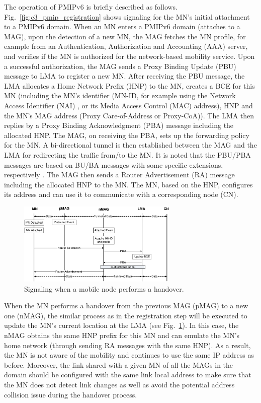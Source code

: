 The operation of PMIPv6 is briefly described as follows. Fig.~\ref{fig:c3_pmip_registration} shows signaling for the MN's initial attachment to a PMIPv6 domain. When an MN enters a PMIPv6 domain (attaches to a MAG), upon the detection of a new MN, the MAG fetches the MN profile, for example from an Authentication, Authorization and Accounting (AAA) server, and verifies if the MN is authorized for the network-based mobility service. Upon a successful authorization, the MAG sends a Proxy Binding Update (PBU) message to LMA to register a new MN. After receiving the PBU message, the LMA allocates a Home Network Prefix (HNP) to the MN, creates a BCE for this MN (including the MN's identifier (MN-ID, for example using the Network Access Identifier (NAI) \cite{NAI}, or its Media Access Control (MAC) address), HNP and the MN's MAG address (Proxy Care-of-Address or Proxy-CoA)). The LMA then replies by a Proxy Binding Acknowledgment (PBA) message including the allocated HNP. The MAG, on receiving the PBA, sets up the forwarding policy for the MN. A bi-directional tunnel is then established between the MAG and the LMA for redirecting the traffic from/to the MN. It is noted that the PBU/PBA messages are based on BU/BA messages with some specific extensions, respectively \cite{PMIPv6}. The MAG then sends a Router Advertisement (RA) message including the allocated HNP to the MN. The MN, based on the HNP, configures its address and can use it to communicate with a corresponding node (CN).
\begin{figure}[h!] 
 \begin{center} 
 \includegraphics[width=0.68\textwidth]{./Part1/Chapter2/figures/c3_pmip_handover.eps} 
    \caption[Signaling when a mobile node performs a handover in the PMIPv6 domain]{Signaling when a mobile node performs a handover.}
     \label{fig:c3_pmip_handover}
  \end{center} 
\end{figure}

When the MN performs a handover from the previous MAG (pMAG) to a new one (nMAG), the similar process as in the registration step will be executed to update the MN’s current location at the LMA (see Fig.~\ref{fig:c3_pmip_handover}). In this case, the nMAG obtains the same HNP prefix for this MN and can emulate the MN’s home network (through sending RA messages with the same HNP). As a result, the MN is not aware of the mobility and continues to use the same IP address as before. Moreover, the link shared with a given MN of all the MAGs in the domain should be configured with the same link local address to make sure that the MN does not detect link changes as well as avoid the potential address collision issue \cite{PMIPv6} during the handover process.

